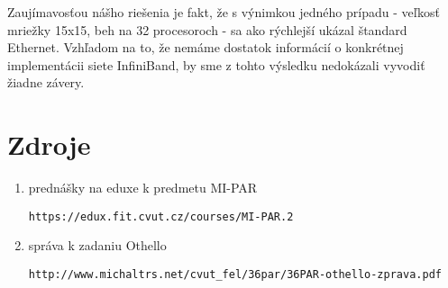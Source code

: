 \documentclass[slovak]{article}
\begin{document}
	Zaujímavosťou nášho riešenia je fakt, že s výnimkou jedného prípadu - veľkosť mriežky 15x15, beh na 32 procesoroch - sa ako rýchlejší ukázal štandard Ethernet. Vzhľadom na to, že nemáme dostatok informácií o konkrétnej implementácii siete InfiniBand, by sme z tohto výsledku nedokázali vyvodiť žiadne závery.
	
\section{Zdroje}

\begin{enumerate}

\item prednášky na eduxe k predmetu MI-PAR \begin{verbatim}https://edux.fit.cvut.cz/courses/MI-PAR.2 \end{verbatim}

\item správa k zadaniu Othello \begin{verbatim}http://www.michaltrs.net/cvut_fel/36par/36PAR-othello-zprava.pdf \end{verbatim}

\end{enumerate}
\end{document}
